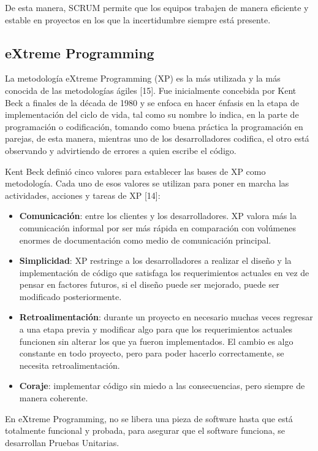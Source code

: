 De esta manera, SCRUM permite que los equipos trabajen de manera eficiente y estable en proyectos en los que la incertidumbre siempre está presente.

\subsection{eXtreme Programming}

La metodología eXtreme Programming (XP) es la más utilizada y la más conocida de las metodologías ágiles [15]. Fue inicialmente concebida por Kent Beck a finales de la década de 1980 y se enfoca en hacer énfasis en la etapa de implementación del ciclo de vida, tal como su nombre lo indica, en la parte de programación o codificación, tomando como buena práctica la programación en parejas, de esta manera, mientras uno de los desarrolladores codifica, el otro está observando y advirtiendo de errores a quien escribe el código.

Kent Beck definió cinco valores para establecer las bases de XP como metodología. Cada uno de esos valores se utilizan para poner en marcha las actividades, acciones y tareas de XP [14]:

\begin{itemize}
\item \textbf{Comunicación}: entre los clientes y los desarrolladores. XP valora más la comunicación informal por ser más rápida en comparación con volúmenes enormes de documentación como medio de comunicación principal.
\item \textbf{Simplicidad}: XP restringe a los desarrolladores a realizar el diseño y la implementación de código que satisfaga los requerimientos actuales en vez de pensar en factores futuros, si el diseño puede ser mejorado, puede ser modificado posteriormente.
\item \textbf{Retroalimentación}: durante un proyecto en necesario muchas veces regresar a una etapa previa y modificar algo para que los requerimientos actuales funcionen sin alterar los que ya fueron implementados. El cambio es algo constante en todo proyecto, pero para poder hacerlo correctamente, se necesita retroalimentación.
\item \textbf{Coraje}: implementar código sin miedo a las consecuencias, pero siempre de manera coherente.
\end{itemize}

En eXtreme Programming, no se libera una pieza de software hasta que está totalmente funcional y probada, para asegurar que el software funciona, se desarrollan Pruebas Unitarias. 


